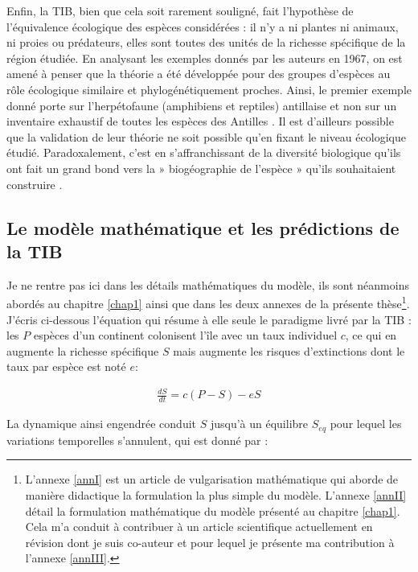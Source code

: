 Enfin, la TIB, bien que cela soit rarement souligné, fait l'hypothèse de
l'équivalence écologique des espèces considérées : il n'y a ni plantes
ni animaux, ni proies ou prédateurs, elles sont toutes des unités de la
richesse spécifique de la région étudiée. En analysant les exemples
donnés par les auteurs en 1967, on est amené à penser que la théorie a
été développée pour des groupes d'espèces au rôle écologique similaire
et phylogénétiquement proches. Ainsi, le premier exemple donné porte sur
l'herpétofaune (amphibiens et reptiles) antillaise et non sur un
inventaire exhaustif de toutes les espèces des Antilles
\citep{MacArthur1967}. Il est d'ailleurs possible que la validation de
leur théorie ne soit possible qu'en fixant le niveau écologique étudié.
Paradoxalement, c'est en s'affranchissant de la diversité biologique
qu'ils ont fait un grand bond vers la » biogéographie de l'espèce »
qu'ils souhaitaient construire \citep[ p.183]{MacArthur1967}.

\subsection*{Le modèle mathématique et les prédictions de la
TIB}\label{le-moduxe8le-mathuxe9matique-et-les-pruxe9dictions-de-la-tib}

Je ne rentre pas ici dans les détails mathématiques du modèle, ils sont
néanmoins abordés au chapitre \ref{chap1} ainsi que dans les deux
annexes de la présente thèse\footnote{L'annexe \ref{annI} est un article
  de vulgarisation mathématique qui aborde de manière didactique la
  formulation la plus simple du modèle. L'annexe \ref{annII} détail la
  formulation mathématique du modèle présenté au chapitre \ref{chap1}.
  Cela m'a conduit à contribuer à un article scientifique actuellement
  en révision dont je suis co-auteur et pour lequel je présente ma
  contribution à l'annexe \ref{annIII}.}. J'écris ci-dessous l'équation
qui résume à elle seule le paradigme livré par la TIB : les \(P\)
espèces d'un continent colonisent l'île avec un taux individuel \(c\),
ce qui en augmente la richesse spécifique \(S\) mais augmente les
risques d'extinctions dont le taux par espèce est noté \(e\):

\begin{eqnarray}
\label{eqMW}
\frac{dS}{dt} = c(P-S)-eS
\end{eqnarray}

La dynamique ainsi engendrée conduit \(S\) jusqu'à un équilibre
\(S_{eq}\) pour lequel les variations temporelles s'annulent, qui est
donné par :

